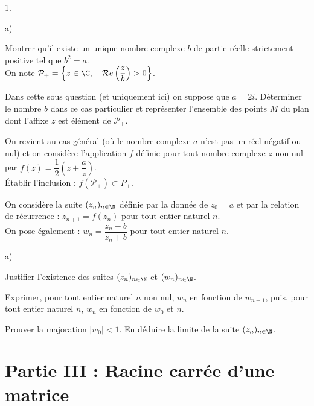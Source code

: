 \documentclass[11pt]{article}%
\begin{document}
\begin{noliste}{1.}
 \setlength{\itemsep}{4mm}
\item 

\begin{noliste}{a)}
 \setlength{\itemsep}{2mm}
\item Montrer qu'il existe un unique nombre complexe $b$ de partie
réelle
strictement positive tel que $b^{2} = a$. \\
On note $\mathcal{P}_{+} = \left\{ z\in \C,\quad \mathcal{R}e\left( 
\dfrac{z}{b}\right) >0\right\} $.

\item Dans cette sous question (et uniquement ici) on suppose que $a =
2i$. Déterminer le nombre $b$ dans ce cas particulier et représenter
l'ensemble des
points $M$ du plan dont l'affixe $z$ est élément de $\mathcal{P}_{+}$.
\end{noliste}

\item On revient au cas général (où le nombre complexe $a$ n'est pas un
réel
négatif ou nul) et on considère l'application $f$ définie pour tout
nombre
complexe $z$ non nul par $f(z) = \dfrac{1}{2}\left( z +
\dfrac{a}{z}\right) $.\\
Établir l'inclusion : $f\left( \mathcal{P}_{+}\right) \subset P_{+}$.

\item On considère la suite $(z_{n})_{n\in \N}$ définie par la donnée
de $z_{0} = a$ et par la relation de récurrence : $z_{n + 1} =
f(z_{n})$ pour
tout entier naturel $n$.\\
On pose également : $w_{n} = \dfrac{z_{n}-b}{z_{n} + b}$ pour tout
entier
naturel $n$.

\begin{noliste}{a)}
 \setlength{\itemsep}{2mm}
\item Justifier l'existence des suites $(z_{n})_{n\in \N}$ et
$(w_{n})_{n\in \N}$.

\item Exprimer, pour tout entier naturel $n$ non nul, $w_{n}$ en
fonction de 
$w_{n-1}$, puis, pour tout entier naturel $n$, $w_{n}$ en fonction de
$w_{0}$
et $n$.
\end{noliste}

\item Prouver la majoration $\left| w_{0}\right| <1$. En déduire la
limite de la suite $(z_{n})_{n\in \N}$.
\end{noliste}

\section*{Partie III : Racine carrée d'une matrice}
\end{document}
